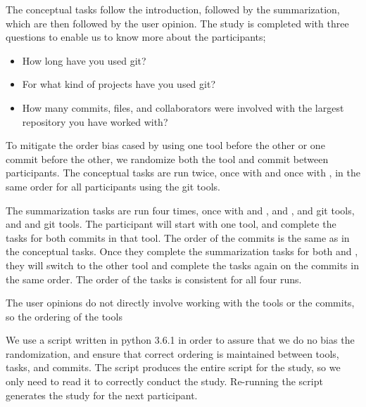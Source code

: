 The conceptual tasks follow the introduction, followed by the
summarization, which are then followed by the user opinion. The study is
completed with three questions to enable us to know more about the
participants;

\begin{itemize}
  \item How long have you used git?
  \item For what kind of projects have you used git?
  \item How many commits, files, and collaborators were involved with
    the largest repository you have worked with?
\end{itemize}



To mitigate the order bias cased by using one tool before the other or
one commit before the other, we randomize both the tool and commit
between participants. The conceptual tasks are run twice, once with
\comA and once with \comB, in the same order for all participants using
the git tools.

 The summarization tasks are run
four times, once with \comA and \tool, \comB and \tool, \comA and git
tools, and \comB and git tools. The participant will start with one
tool, and complete the tasks for both commits in that tool. The order of
the commits is the same as in the conceptual tasks. Once they complete
the summarization tasks for both \comA and \comB, they will switch to
the other tool and complete the tasks again on the commits in the same
order. The order of the tasks is consistent for all four runs.

The user opinions do not directly involve working with the tools or the
commits, so the ordering of the tools


We use a script written in python 3.6.1 in order to assure that we do no
bias the randomization, and ensure that correct ordering is maintained
between tools, tasks, and commits. The script produces the entire script
for the study, so we only need to read it to correctly conduct the
study. Re-running the script generates the study for the next
participant.


